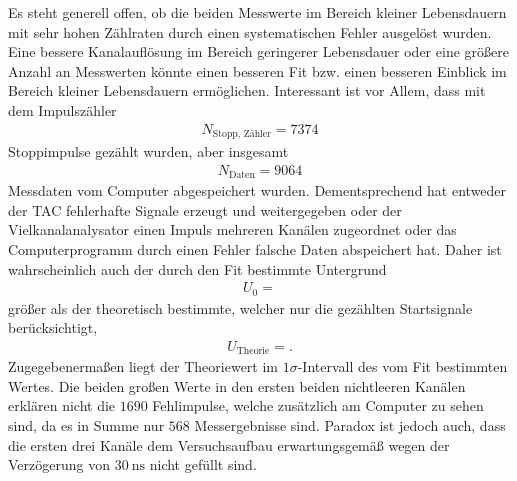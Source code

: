 Es steht generell offen, ob die beiden Messwerte im Bereich kleiner Lebensdauern mit sehr hohen Zählraten durch einen systematischen Fehler ausgelöst wurden. %
Eine bessere Kanalauflösung im Bereich geringerer Lebensdauer oder eine größere Anzahl an Messwerten könnte einen besseren Fit bzw. einen besseren Einblick im Bereich kleiner Lebensdauern ermöglichen.
Interessant ist vor Allem, dass mit dem Impulszähler
\begin{align*}
  N_\text{Stopp, Zähler} = \num{7374}
\end{align*}
Stoppimpulse gezählt wurden, aber insgesamt
\begin{align*}
  N_\text{Daten} = \num{9064}
\end{align*}
Messdaten vom Computer abgespeichert wurden.
Dementsprechend hat entweder der TAC fehlerhafte Signale erzeugt und weitergegeben oder der Vielkanalanalysator einen Impuls mehreren Kanälen zugeordnet oder das Computerprogramm durch einen Fehler falsche Daten abspeichert hat.
Daher ist wahrscheinlich auch der durch den Fit bestimmte Untergrund
\begin{align*}
  U_0 = 
\end{align*}
größer als der theoretisch bestimmte, welcher nur die gezählten Startsignale berücksichtigt,
\begin{align*}
  U_{\text{Theorie}} = .
\end{align*}
Zugegebenermaßen liegt der Theoriewert im $1\sigma$-Intervall des vom Fit bestimmten Wertes.
Die beiden großen Werte in den ersten beiden nichtleeren Kanälen erklären nicht die $\num{1690}$ Fehlimpulse, welche zusätzlich am Computer zu sehen sind, da es in Summe nur $\num{568}$ Messergebnisse sind.
Paradox ist jedoch auch, dass die ersten drei Kanäle dem Versuchsaufbau erwartungsgemäß wegen der Verzögerung von $\SI{30}{\nano\second}$ nicht gefüllt sind.
